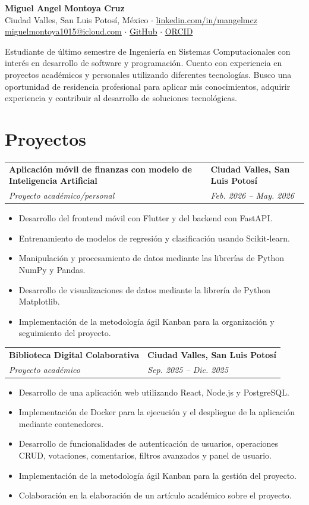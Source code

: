 \documentclass[10pt,letterpaper]{article}
\makeatletter
\newcommand{\cvheading}[4]{%
  \begin{tabularx}{\textwidth}{@{}X>{\raggedleft\arraybackslash}p{4.0cm}@{}}
    \textbf{#1} & \textbf{#2}\\
    \textit{#3} & \textit{#4}
  \end{tabularx}
}
\makeatother
\begin{document}
\begin{center}
  {\LARGE\textbf{Miguel Angel Montoya Cruz}}\\[4pt]
  Ciudad Valles, San Luis Potosí, México
  \enspace$\cdot$\enspace
  \href{https://linkedin.com/in/mangelmcz}{linkedin.com/in/mangelmcz}
  \href{mailto:miguelmontoya1015@icloud.com}{miguelmontoya1015@icloud.com}
  \enspace$\cdot$\enspace
  \href{https://github.com/}{GitHub}
  \enspace$\cdot$\enspace
  \href{https://orcid.org/}{ORCID}
\end{center}

\vspace{2pt}
Estudiante de último semestre de Ingeniería en Sistemas Computacionales con interés en desarrollo de software y programación. Cuento con experiencia en proyectos académicos y personales utilizando diferentes tecnologías. Busco una oportunidad de residencia profesional para aplicar mis conocimientos, adquirir experiencia y contribuir al desarrollo de soluciones tecnológicas.

\section*{Proyectos}

\cvheading
  {Aplicación móvil de finanzas con modelo de Inteligencia Artificial}
  {Ciudad Valles, San Luis Potosí}
  {Proyecto académico/personal}
  {Feb. 2026 -- May. 2026}
\begin{itemize}
  \item Desarrollo del frontend móvil con Flutter y del backend con FastAPI.
  \item Entrenamiento de modelos de regresión y clasificación usando Scikit-learn.
  \item Manipulación y procesamiento de datos mediante las librerías de Python NumPy y Pandas.
  \item Desarrollo de visualizaciones de datos mediante la librería de Python Matplotlib.
  \item Implementación de la metodología ágil Kanban para la organización y seguimiento del proyecto.
\end{itemize}

\vspace{3pt}
\cvheading
  {Biblioteca Digital Colaborativa}
  {Ciudad Valles, San Luis Potosí}
  {Proyecto académico}
  {Sep. 2025 -- Dic. 2025}
\begin{itemize}
  \item Desarrollo de una aplicación web utilizando React, Node.js y PostgreSQL.
  \item Implementación de Docker para la ejecución y el despliegue de la aplicación mediante contenedores.
  \item Desarrollo de funcionalidades de autenticación de usuarios, operaciones CRUD, votaciones, comentarios, filtros avanzados y panel de usuario.
  \item Implementación de la metodología ágil Kanban para la gestión del proyecto.
  \item Colaboración en la elaboración de un artículo académico sobre el proyecto.
\end{itemize}
\end{document}
